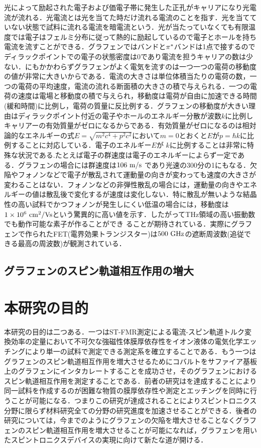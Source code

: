 光によって励起された電子および価電子帯に発生した正孔がキャリアになり光電流が流れる．光電流とは光を当てた時だけ流れる電流のことを指す．光を当てていない状態で試料に流れる電流を暗電流という．光が当たっていなくても有限温度では電子はフェルミ分布に従って熱的に励起しているので電子とホールを持ち電流を流すことができる．グラフェンでは\pi バンドと$\rm\pi^{*}$バンドは1点で接するのでディラックポイントでの電子の状態密度は0であり電流を担うキャリアの数は少ない．にもかかわらずグラフェンがよく電気を流すのは一つ一つの電荷の移動度の値が非常に大きいからである．電流の大きさは単位体積当たりの電荷の数，一つの電荷の平均速度，電流の流れる断面積の大きさの積で与えられる．一つの電荷の速度は電場と移動度の積で与えられ，移動度は電荷が自由に加速できる時間(緩和時間)に比例し，電荷の質量に反比例する．グラフェンの移動度が大きい理由はディラックポイント付近の電子やホールのエネルギー分散が波数$k$に比例しキャリアーの有効質量がゼロになるからである．有効質量がゼロになるのは相対論的なエネルギーの式$E = \sqrt{m^{2}c^{4} + p^{2}c^{2}}$において$m=0$とおくと$E$が$p=\hbar k$に比例することに対応している．電子のエネルギー$E$が $k$に比例することは非常に特殊な状況である.たとえば電子の群速度は電子のエネルギーによらず一定である．グラフェンの場合には群速度は$106\rm\ m/s$ であり光速の300分の1にもなる．欠陥やフォノンなどで電子が散乱されて運動量の向きが変わっても速度の大きさが変わることはない．フォノンなどの非弾性散乱の場合には，運動量の向きやエネルギーの値は散乱後で変化するが速度は変化しない．特に散乱が無いような結晶性の高い試料でかつフォノンが発生しにくい低温の場合には，移動度は$1\times10^{6}\rm\ cm^{2}/Vs$という驚異的に高い値を示す．したがってTHz領域の高い振動数でも動作可能な素子が作ることができ ることが期待されている．実際にグラフェンで作られたFET(電界効果トランジスター)は$500\rm\ GHz$の遮断周波数(追従できる最高の周波数)が観測されている．

\subsection{グラフェンのスピン軌道相互作用の増大}



\section{本研究の目的}
本研究の目的は二つある．一つはST-FMR測定による電流-スピン軌道トルク変換効率の定量において不可欠な強磁性体膜厚依存性をイオン液体の電気化学エッチングにより単一の試料で測定できる測定系を確立することである．もう一つはグラフェンのスピン軌道相互作用を増大させるためにコバルトをサファイア基板上のグラフェンにインタカレートすることを成功させ，そのグラフェンにおけるスピン軌道相互作用を測定することである．前者の研究はを達成することにより同一試料を作成するのが困難な物質の膜厚依存性や測定とエッチングを同時に行うことが可能になる．つまりこの研究が達成されることによりスピントロニクス分野に限らず材料研究全ての分野の研究進度を加速させることができる．後者の研究については，今までのようにグラフェンの欠陥を増大させることなくグラフェンのスピン軌道相互作用を増大させることが可能になれば，グラフェンを用いたスピントロニクスデバイスの実現に向けて新たな道が開ける．



